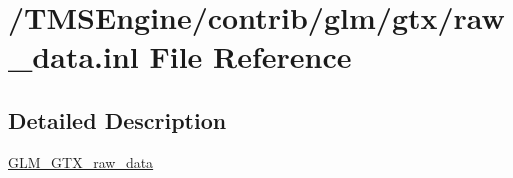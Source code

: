 \hypertarget{raw__data_8inl}{}\section{/\+T\+M\+S\+Engine/contrib/glm/gtx/raw\+\_\+data.inl File Reference}
\label{raw__data_8inl}


\subsection{Detailed Description}
\hyperlink{group__gtx__raw__data}{G\+L\+M\+\_\+\+G\+T\+X\+\_\+raw\+\_\+data} 